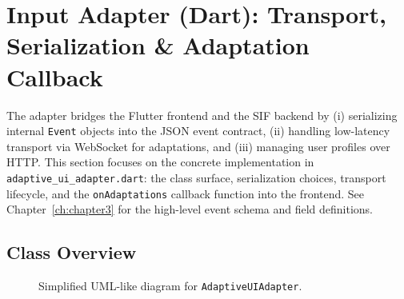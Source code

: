 \documentclass[openany]{book}
\begin{document}
\section{Input Adapter (Dart): Transport, Serialization \& Adaptation Callback}
The adapter bridges the Flutter frontend and the SIF backend by (i) serializing internal \texttt{Event} objects into the JSON event contract, (ii) handling low-latency transport via WebSocket for adaptations, and (iii) managing user profiles over HTTP. This section focuses on the concrete implementation in \texttt{adaptive\_ui\_adapter.dart}: the class surface, serialization choices, transport lifecycle, and the \texttt{onAdaptations} callback function into the frontend. See Chapter~\ref{ch:chapter3} for the high-level event schema and field definitions.

\subsection{Class Overview}
\begin{figure}[H]
\centering
{}
\caption{Simplified UML-like diagram for \texttt{AdaptiveUIAdapter}.}
\label{fig:adaptive-ui-adapter}
\end{figure}
\end{document}
